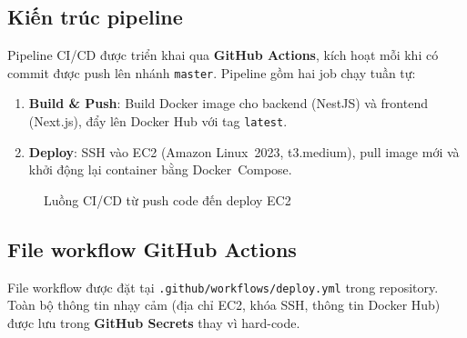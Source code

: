 \subsection{Kiến trúc pipeline}

Pipeline CI/CD được triển khai qua \textbf{GitHub Actions},
kích hoạt mỗi khi có commit được push lên nhánh \texttt{master}.
Pipeline gồm hai job chạy tuần tự:

\begin{enumerate}
  \item \textbf{Build \& Push}: Build Docker image cho backend (NestJS)
        và frontend (Next.js), đẩy lên Docker Hub với tag \texttt{latest}.
  \item \textbf{Deploy}: SSH vào EC2 (Amazon Linux~2023, t3.medium),
        pull image mới và khởi động lại container bằng Docker~Compose.
\end{enumerate}

\begin{figure}[H]
\centering
{}
\caption{Luồng CI/CD từ push code đến deploy EC2}
\label{fig:cicd_pipeline}
\end{figure}

\subsection{File workflow GitHub Actions}

File workflow được đặt tại \texttt{.github/workflows/deploy.yml} trong
repository. Toàn bộ thông tin nhạy cảm (địa chỉ EC2, khóa SSH, thông tin
Docker Hub) được lưu trong \textbf{GitHub Secrets} thay vì hard-code.

